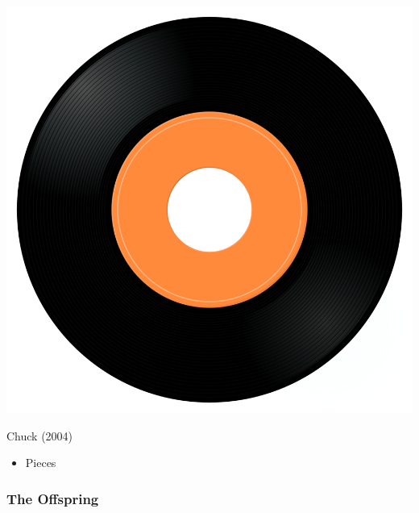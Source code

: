 \begin{minipage}[t]{0.25\textwidth}
\captionsetup{type=figure}
\includegraphics[width=\textwidth]{Images/cover.png}
\caption*{Chuck (2004)}
\end{minipage}
\begin{minipage}[t]{0.25\textwidth}\vspace{0pt}
\begin{itemize}[nosep,leftmargin=1em,labelwidth=*,align=left]
	\setlength{\itemsep}{0pt}
	\item Pieces
\end{itemize}
\end{minipage}

\subsubsection{The Offspring}

